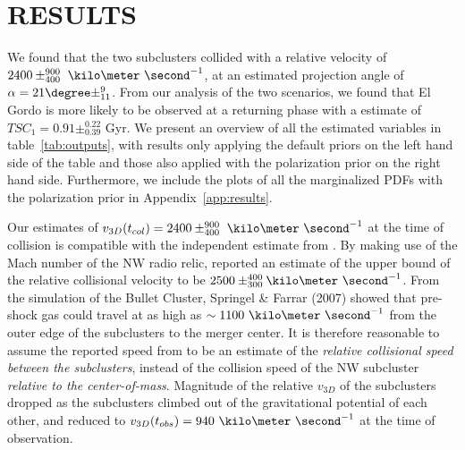 \section{RESULTS} 
We found that the two subclusters collided with a relative velocity of $2400\pm^{900}_{400}~\kilo\meter~\second^{-1}$, at an estimated projection
angle of $\alpha = 21\degree\pm^{9}_{11}$. From our analysis of the two
scenarios, we found that El Gordo is more likely to be observed at a returning
phase with a estimate of $TSC_1 = 0.91\pm^{0.22}_{0.39}$ Gyr. We present an
overview of all the estimated variables in table~\ref{tab:outputs}, with
results only applying the default priors on the left hand side of the table
and those also applied with the polarization prior on the right hand side.
Furthermore, we include the plots of all the marginalized PDFs with the
polarization prior in Appendix~\ref{app:results}. \par 
Our estimates of $v_{3D}(t_{col}) = 2400\pm^{900}_{400}~\kilo\meter~\second^{-1}$ 
at the time of collision is compatible with the independent estimate from \citealt{L13}. 
By making use of the Mach number of the NW radio relic, \cite{L13}
reported an estimate of the upper bound of the relative collisional
velocity to be $2500
\pm^{400}_{300}\kilo\meter~\second^{-1}$. 
From the simulation of the Bullet Cluster, Springel \& Farrar (2007) showed
that pre-shock gas could travel at as high as $\sim
1100~\kilo\meter~\second^{-1}$ from the outer edge of the subclusters to
the merger center.  It is therefore reasonable to assume the reported speed
from \cite{L13} to be an estimate of the {\it relative collisional speed
between the subclusters}, instead of the collision speed of the NW
subcluster {\it relative to the center-of-mass}.
Magnitude of the relative $v_{3D}$ of the subclusters dropped as the
subclusters climbed out of the gravitational potential of each other, and
reduced to $v_{3D}(t_{obs}) = 940~\kilo\meter~\second^{-1}$ at
the time of observation.\par 


